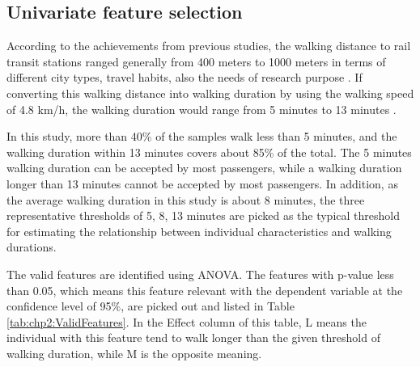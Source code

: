 %
\subsection{Univariate feature selection}
%
According to the achievements from previous studies, the walking distance to rail transit stations ranged generally from 400 meters to 1000 meters in terms of different city types, travel habits, also the needs of research purpose \cite{guerra2012half,murray1998public,o1996walking,keijer2000people,zhao2003forecasting,alshalalfah2007case}. If converting this walking distance into walking duration by using the walking speed of 4.8 km/h, the walking duration would range from 5 minutes to 13 minutes \cite{bohannon1997comfortable}. 

%
In this study, more than 40\% of the samples walk less than 5 minutes, and the walking duration within 13 minutes covers about 85\% of the total. The 5 minutes walking duration can be accepted by most passengers, while a walking duration longer than 13 minutes cannot be accepted by most passengers. In addition, as the average walking duration in this study is about 8 minutes, the three representative thresholds of 5, 8, 13 minutes are picked as the typical threshold for estimating the relationship between individual characteristics and walking durations. 

%
The valid features are identified using ANOVA. The features with p-value less than 0.05, which means this feature relevant with the dependent variable at the confidence level of 95\%, are picked out and listed in Table \ref{tab:chp2:ValidFeatures}. In the Effect column of this table, L means the individual with this feature tend to walk longer than the given threshold of walking duration, while M is the opposite meaning.

